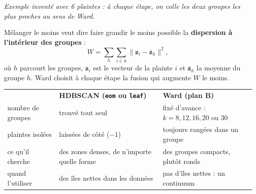 \noindent\begin{minipage}{\linewidth}
\begin{center}
\end{center}
{\small\color{slate}\textit{Exemple inventé avec 6 plaintes : à chaque étape, on colle les deux groupes les plus proches au sens de Ward.}}
\end{minipage}


\begin{formulabox}
\og Mélanger le moins \fg{} veut dire faire grandir le moins possible la \textbf{dispersion à l'intérieur des
groupes} :
\[
W = \sum_{h} \sum_{i \in h} \lVert \mathbf{z}_i - \bar{\mathbf{z}}_h \rVert^2 ,
\]
où $h$ parcourt les groupes, $\mathbf{z}_i$ est le vecteur de la plainte $i$ et $\bar{\mathbf{z}}_h$ la
moyenne du groupe $h$. Ward choisit à chaque étape la fusion qui augmente $W$ le moins.
\end{formulabox}

\begin{center}
\renewcommand{\arraystretch}{1.3}
\begin{tabular}{@{}>{\raggedright\arraybackslash}p{4.2cm}>{\raggedright\arraybackslash}p{5cm}>{\raggedright\arraybackslash}p{5cm}@{}}
\rowcolor{titlebg} & \color{white}\textbf{HDBSCAN (\texttt{eom} ou \texttt{leaf})} & \color{white}\textbf{Ward (plan B)} \\
nombre de groupes & trouvé tout seul & fixé d'avance : $k = 8, 12, 16, 20$ ou $30$ \\
plaintes isolées & laissées de côté ($-1$) & toujours rangées dans un groupe \\
ce qu'il cherche & des zones denses, de n'importe quelle forme & des groupes compacts, plutôt ronds \\
quand l'utiliser & des îles nettes dans les données & pas d'îles nettes : un continuum \\
\end{tabular}
\end{center}

